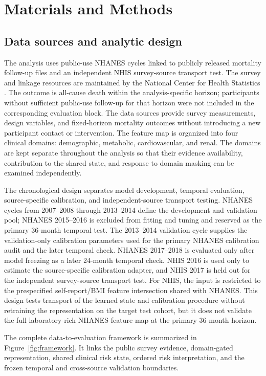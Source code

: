 \documentclass[12pt]{article}
\begin{document}
\section{Materials and Methods}
\subsection{Data sources and analytic design}
The analysis uses public-use NHANES cycles linked to publicly released mortality follow-up files and an independent NHIS survey-source transport test. The survey and linkage resources are maintained by the National Center for Health Statistics \cite{nchs_2024_nhanes_mortality}. The outcome is all-cause death within the analysis-specific horizon; participants without sufficient public-use follow-up for that horizon were not included in the corresponding evaluation block. The data sources provide survey measurements, design variables, and fixed-horizon mortality outcomes without introducing a new participant contact or intervention. The feature map is organized into four clinical domains: demographic, metabolic, cardiovascular, and renal. The domains are kept separate throughout the analysis so that their evidence availability, contribution to the shared state, and response to domain masking can be examined independently.

The chronological design separates model development, temporal evaluation, source-specific calibration, and independent-source transport testing. NHANES cycles from 2007--2008 through 2013--2014 define the development and validation pool; NHANES 2015--2016 is excluded from fitting and tuning and reserved as the primary 36-month temporal test. The 2013--2014 validation cycle supplies the validation-only calibration parameters used for the primary NHANES calibration audit and the later temporal check. NHANES 2017--2018 is evaluated only after model freezing as a later 24-month temporal check. NHIS 2016 is used only to estimate the source-specific calibration adapter, and NHIS 2017 is held out for the independent survey-source transport test. For NHIS, the input is restricted to the prespecified self-report/BMI feature intersection shared with NHANES. This design tests transport of the learned state and calibration procedure without retraining the representation on the target test cohort, but it does not validate the full laboratory-rich NHANES feature map at the primary 36-month horizon.

The complete data-to-evaluation framework is summarized in Figure~\ref{fig:framework}. It links the public survey evidence, domain-gated representation, shared clinical risk state, ordered risk interpretation, and the frozen temporal and cross-source validation boundaries.
\end{document}
